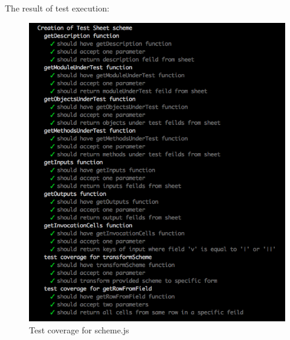 The result of test execution:
\begin{figure}[H]
	\centering
	\includegraphics[width=\linewidth]{grafiken/testScheme.png}
	\caption{Test coverage for scheme.js}
	\label{fig:testScheme}
\end{figure}

